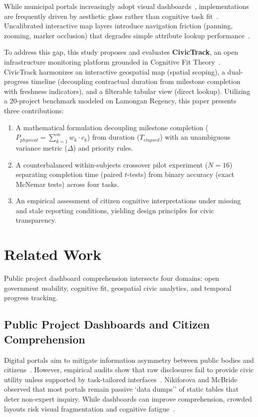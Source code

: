 \documentclass[runningheads]{llncs}
\begin{document}
While municipal portals increasingly adopt visual dashboards~\cite{ansari2022enhancing,chokki2022engaging}, implementations are frequently driven by aesthetic gloss rather than cognitive task fit~\cite{chokki2022engaging,nikiforova2021open}. Uncalibrated interactive map layers introduce navigation friction (panning, zooming, marker occlusion) that degrades simple attribute lookup performance~\cite{bina2023incorporating,duncan2021task}.

To address this gap, this study proposes and evaluates \textbf{CivicTrack}, an open infrastructure monitoring platform grounded in Cognitive Fit Theory~\cite{bina2023incorporating,bacic2022advancing}. CivicTrack harmonizes an interactive geospatial map (spatial scoping), a dual-progress timeline (decoupling contractual duration from milestone completion with freshness indicators), and a filterable tabular view (direct lookup). Utilizing a 20-project benchmark modeled on Lamongan Regency, this paper presents three contributions:
\begin{enumerate}\setlength{\itemsep}{0.8pt}\setlength{\parskip}{0pt}
    \item A mathematical formulation decoupling milestone completion ($P_{physical} = \sum_{k=1}^m w_k \cdot c_k$) from duration ($T_{elapsed}$) with an unambiguous variance metric ($\Delta$) and priority rules.
    \item A counterbalanced within-subjects crossover pilot experiment ($N = 16$) separating completion time (paired $t$-tests) from binary accuracy (exact McNemar tests) across four tasks.
    \item An empirical assessment of citizen cognitive interpretations under missing and stale reporting conditions, yielding design principles for civic transparency.
\end{enumerate}

\section{Related Work}
Public project dashboard comprehension intersects four domains: open government usability, cognitive fit, geospatial civic analytics, and temporal progress tracking.

\subsection{Public Project Dashboards and Citizen Comprehension}
Digital portals aim to mitigate information asymmetry between public bodies and citizens~\cite{ansari2022enhancing,chokki2022engaging,kempeneer2023rethinking}. However, empirical audits show that raw disclosures fail to provide civic utility unless supported by task-tailored interfaces~\cite{ansari2022enhancing,matheus2021design}. Nikiforova and McBride~\cite{nikiforova2021open} observed that most portals remain passive `data dumps'' of static tables that deter non-expert inquiry. While dashboards can improve comprehension, crowded layouts risk visual fragmentation and cognitive fatigue~\cite{chokki2022engaging,zhao2023digital,kempeneer2023rethinking}.
\end{document}
